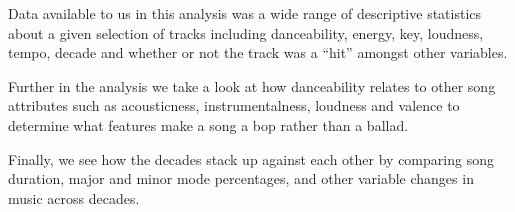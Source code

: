 \documentclass[
  12pt,
]{article}
\begin{document}
\vspace{8pt}

Data available to us in this analysis was a wide range of descriptive
statistics about a given selection of tracks including danceability,
energy, key, loudness, tempo, decade and whether or not the track was a
``hit'' amongst other variables.

\vspace{8pt}

Further in the analysis we take a look at how danceability relates to
other song attributes such as acousticness, instrumentalness, loudness
and valence to determine what features make a song a bop rather than a
ballad.

\vspace{8pt}

Finally, we see how the decades stack up against each other by comparing
song duration, major and minor mode percentages, and other variable
changes in music across decades.
\end{document}
